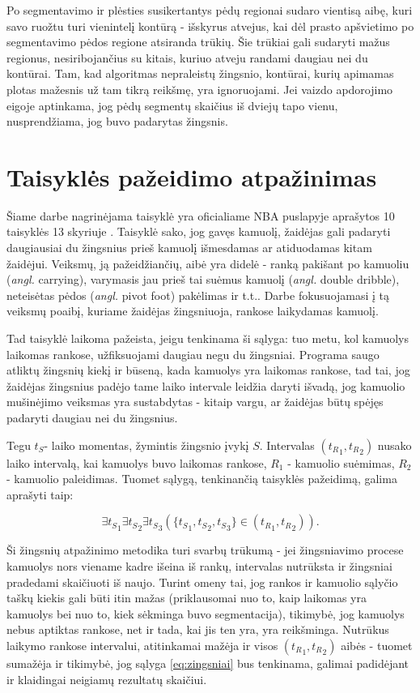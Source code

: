 \documentclass{VUMIFPSkursinis}
\begin{document}
 Po segmentavimo ir plėsties susikertantys pėdų regionai sudaro vientisą aibę, kuri savo ruožtu turi vienintelį kontūrą - išskyrus atvejus, kai dėl prasto apšvietimo po segmentavimo pėdos regione atsiranda trūkių. Šie trūkiai gali sudaryti mažus regionus, nesiribojančius su kitais, kuriuo atveju randami daugiau nei du kontūrai. Tam, kad algoritmas nepraleistų žingsnio, kontūrai, kurių apimamas plotas mažesnis už tam tikrą reikšmę, yra ignoruojami. Jei vaizdo apdorojimo eigoje aptinkama, jog pėdų segmentų skaičius iš dviejų tapo vienu, nusprendžiama, jog buvo padarytas žingsnis. 

\section{Taisyklės pažeidimo atpažinimas}
Šiame darbe nagrinėjama taisyklė yra oficialiame NBA puslapyje aprašytos 10 taisyklės 13 skyriuje \cite{NBARules}. Taisyklė sako, jog gavęs kamuolį, žaidėjas gali padaryti daugiausiai du žingsnius prieš kamuolį išmesdamas ar atiduodamas kitam žaidėjui. Veiksmų, ją pažeidžiančių, aibė yra didelė - ranką pakišant po kamuoliu (\textit{angl.} carrying), varymasis jau prieš tai suėmus kamuolį (\textit{angl.} double dribble), neteisėtas pėdos (\textit {angl.} pivot foot) pakėlimas ir t.t.. Darbe fokusuojamasi į tą veiksmų poaibį, kuriame žaidėjas žingsniuoja, rankose laikydamas kamuolį. 

Tad taisyklė laikoma pažeista, jeigu tenkinama ši sąlyga:  tuo metu, kol kamuolys laikomas rankose, užfiksuojami daugiau negu du žingsniai. Programa saugo atliktų žingsnių kiekį ir būseną, kada kamuolys yra laikomas rankose, tad tai, jog žaidėjas žingsnius padėjo tame laiko intervale leidžia daryti išvadą, jog kamuolio mušinėjimo veiksmas yra sustabdytas - kitaip vargu, ar žaidėjas būtų spėjęs padaryti daugiau nei du žingsnius. 

Tegu $t_S$- laiko momentas, žymintis žingsnio įvykį $S$. Intervalas $({t_R}_1,{ t_R}_2)$ nusako laiko intervalą, kai kamuolys buvo laikomas rankose, $R_1$ - kamuolio suėmimas, $R_2$ - kamuolio paleidimas. Tuomet sąlygą, tenkinančią taisyklės pažeidimą, galima aprašyti taip: 

\begin{equation}\label{eq:zingsniai}
\exists {t_S}_1\exists {t_S}_2 \exists {t_S}_3 ( \{{t_S}_1,  {t_S}_2,  {t_S}_3\} \in	({t_R}_1, {t_R}_2) ).
\end{equation}

Ši žingsnių atpažinimo metodika turi svarbų trūkumą - jei žingsniavimo procese kamuolys nors viename kadre išeina iš rankų, intervalas nutrūksta ir žingsniai pradedami skaičiuoti iš naujo. Turint omeny tai, jog rankos ir kamuolio sąlyčio taškų kiekis gali būti itin mažas (priklausomai nuo to, kaip laikomas yra kamuolys bei nuo to, kiek sėkminga buvo segmentacija), tikimybė, jog kamuolys nebus aptiktas rankose, net ir tada, kai jis ten yra, yra reikšminga. Nutrūkus laikymo rankose intervalui, atitinkamai mažėja ir visos $({t_R}_1,{ t_R}_2)$ aibės - tuomet sumažėja ir tikimybė, jog sąlyga \ref{eq:zingsniai} bus tenkinama, galimai padidėjant ir klaidingai neigiamų rezultatų skaičiui.
\end{document}
